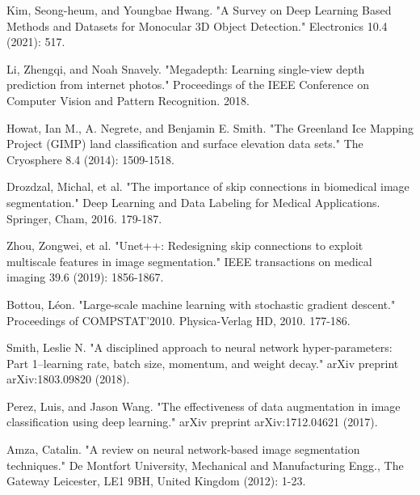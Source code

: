 \documentclass{article}
\begin{document}
\begin{thebibliography}{10}
 Kim, Seong-heum, and Youngbae Hwang. "A Survey on Deep Learning Based Methods and Datasets for Monocular 3D Object Detection." Electronics 10.4 (2021): 517.


 Li, Zhengqi, and Noah Snavely. "Megadepth: Learning single-view depth prediction from internet photos." Proceedings of the IEEE Conference on Computer Vision and Pattern Recognition. 2018.

 Howat, Ian M., A. Negrete, and Benjamin E. Smith. "The Greenland Ice Mapping Project (GIMP) land classification and surface elevation data sets." The Cryosphere 8.4 (2014): 1509-1518.

 Drozdzal, Michal, et al. "The importance of skip connections in biomedical image segmentation." Deep Learning and Data Labeling for Medical Applications. Springer, Cham, 2016. 179-187.

 Zhou, Zongwei, et al. "Unet++: Redesigning skip connections to exploit multiscale features in image segmentation." IEEE transactions on medical imaging 39.6 (2019): 1856-1867.

 Bottou, Léon. "Large-scale machine learning with stochastic gradient descent." Proceedings of COMPSTAT'2010. Physica-Verlag HD, 2010. 177-186.

 Smith, Leslie N. "A disciplined approach to neural network hyper-parameters: Part 1--learning rate, batch size, momentum, and weight decay." arXiv preprint arXiv:1803.09820 (2018).

 Perez, Luis, and Jason Wang. "The effectiveness of data augmentation in image classification using deep learning." arXiv preprint arXiv:1712.04621 (2017).

 Amza, Catalin. "A review on neural network-based image segmentation techniques." De Montfort University, Mechanical and Manufacturing Engg., The Gateway Leicester, LE1 9BH, United Kingdom (2012): 1-23.

\end{thebibliography}
\end{document}
